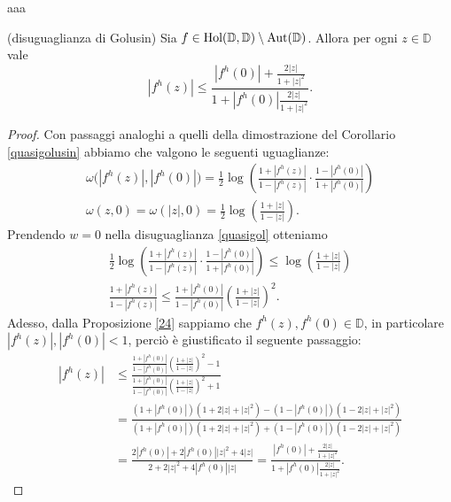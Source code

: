 aaa

\begin{thm} \label{golusin}
  (disuguaglianza di Golusin) Sia $f \in \text{\normalfont{Hol}}(\mathbb{D},\mathbb{D})\setminus\text{\normalfont{Aut}}(\mathbb{D})$. Allora per ogni $z \in \mathbb{D}$ vale
  \begin{equation} \label{gol}
    |f^h(z)| \le \frac{|f^h(0)|+\frac{2|z|}{1+|z|^2}}{1+|f^h(0)|\frac{2|z|}{1+|z|^2}}.
  \end{equation}
\end{thm}

\begin{proof}
  Con passaggi analoghi a quelli della dimostrazione del Corollario \ref{quasigolusin} abbiamo che valgono le seguenti uguaglianze:
  \begin{gather*}
    \omega\bigl(|f^h(z)|,|f^h(0)|\bigr)=\frac{1}{2}\log\left(\frac{1+|f^h(z)|}{1-|f^h(z)|}\cdot\frac{1-|f^h(0)|}{1+|f^h(0)|}\right)\\
    \omega(z, 0)=\omega(|z|,0)=\frac{1}{2}\log\left(\frac{1+|z|}{1-|z|}\right).
  \end{gather*}
  Prendendo $w=0$ nella disuguaglianza \eqref{quasigol} otteniamo
  \begin{align}
    \nonumber \frac{1}{2}\log\left(\frac{1+|f^h(z)|}{1-|f^h(z)|}\cdot\frac{1-|f^h(0)|}{1+|f^h(0)|}\right) \le \log\left(\frac{1+|z|}{1-|z|}\right) \\
    \frac{1+|f^h(z)|}{1-|f^h(z)|} \le \frac{1+|f^h(0)|}{1-|f^h(0)|}\left(\frac{1+|z|}{1-|z|}\right)^2. \label{golprimo}
  \end{align}
  Adesso, dalla Proposizione \ref{24} sappiamo che $f^h(z),f^h(0) \in \mathbb{D}$, in particolare $|f^h(z)|,|f^h(0)|<1$, perciò è giustificato il seguente passaggio:
  \begin{align*}
    |f^h(z)| & \le \frac{\frac{1+|f^h(0)|}{1-|f^h(0)|}\left(\frac{1+|z|}{1-|z|}\right)^2-1}{\frac{1+|f^h(0)|}{1-|f^h(0)|}\left(\frac{1+|z|}{1-|z|}\right)^2+1} \\
    & =\frac{(1+|f^h(0)|)(1+2|z|+|z|^2)-(1-|f^h(0)|)(1-2|z|+|z|^2)}{(1+|f^h(0)|)(1+2|z|+|z|^2)+(1-|f^h(0)|)(1-2|z|+|z|^2)} \\
    & =\frac{2|f^h(0)|+2|f^h(0)||z|^2+4|z|}{2+2|z|^2+4|f^h(0)||z|}=\frac{|f^h(0)|+\frac{2|z|}{1+|z|^2}}{1+|f^h(0)|\frac{2|z|}{1+|z|^2}}.
  \end{align*}
\end{proof}
